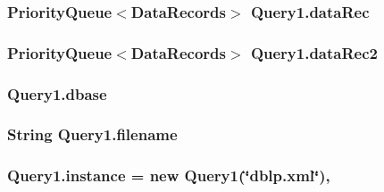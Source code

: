 \subsubsection[{\texorpdfstring{data\+Rec}{dataRec}}]{\setlength{\rightskip}{0pt plus 5cm}Priority\+Queue$<${\bf Data\+Records}$>$ Query1.\+data\+Rec\hspace{0.3cm}{\ttfamily [private]}}\hypertarget{classQuery1_a418a5ab9b0660ea8b3c5481beb385bbc}{}\label{classQuery1_a418a5ab9b0660ea8b3c5481beb385bbc}
\subsubsection[{\texorpdfstring{data\+Rec2}{dataRec2}}]{\setlength{\rightskip}{0pt plus 5cm}Priority\+Queue$<${\bf Data\+Records}$>$ Query1.\+data\+Rec2\hspace{0.3cm}{\ttfamily [private]}}\hypertarget{classQuery1_ace614dbbc820194d2c7092827b9c2491}{}\label{classQuery1_ace614dbbc820194d2c7092827b9c2491}
\subsubsection[{\texorpdfstring{dbase}{dbase}}]{ Query1.\+dbase\hspace{0.3cm}{\ttfamily [private]}}\hypertarget{classQuery1_af7fea4172dbe6f682854a92fed28e583}{}\label{classQuery1_af7fea4172dbe6f682854a92fed28e583}
\subsubsection[{\texorpdfstring{filename}{filename}}]{\setlength{\rightskip}{0pt plus 5cm}String Query1.\+filename\hspace{0.3cm}{\ttfamily [private]}}\hypertarget{classQuery1_a747a19c9f4b24c9c47f7c7f13e8932e7}{}\label{classQuery1_a747a19c9f4b24c9c47f7c7f13e8932e7}
\subsubsection[{\texorpdfstring{instance}{instance}}]{ Query1.\+instance = new {\bf Query1}(\char`\"{}dblp.\+xml\char`\"{})\hspace{0.3cm}{\ttfamily [static]}, {\ttfamily [private]}}\hypertarget{classQuery1_aca7ee51acbe7e939d39bbd950738fef2}{}\label{classQuery1_aca7ee51acbe7e939d39bbd950738fef2}
